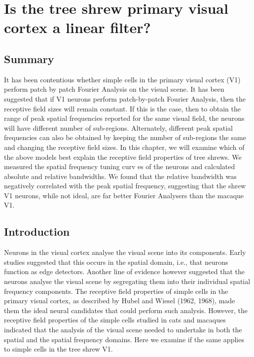 \chapter{Is the tree shrew primary visual cortex a linear filter?}
\pagebreak
	\section{Summary}
	It has been contentious whether simple cells in the primary visual cortex (V1) perform patch by patch Fourier Analysis on the visual scene. It has been suggested that if V1 neurons perform patch-by-patch Fourier Analysis, then the receptive field sizes will remain constant. If this is the case, then to obtain the range of peak spatial frequencies reported for the same visual field, the neurons will have different number of sub-regions. Alternately, different peak spatial frequencies can also be obtained by keeping the number of sub-regions the same and changing the receptive field sizes. In this chapter, we will examine which of the above models best explain the receptive field properties of tree shrews. We measured the spatial frequency tuning curv es of the neurons and calculated absolute and relative bandwidths. We found that the relative bandwidth was negatively correlated with the peak spatial frequency, suggesting that the shrew V1 neurons, while not ideal, are far better Fourier Analysers than the macaque V1.
	\pagebreak
	\section{Introduction}
	
	Neurons in the visual cortex analyse the visual scene into its components. Early studies suggested that this occurs in the spatial domain, i.e., that neurons function as edge detectors. Another line of evidence however suggested that the neurons analyse the visual scene by segregating them into their individual spatial frequency components. The receptive field properties of simple cells in the primary visual cortex, as described by Hubel and Wiesel (1962, 1968), made them the ideal neural candidates that could perform such analysis. However, the receptive field properties of the simple cells studied in cats and macaques indicated that the analysis of the visual scene needed to undertake in both the spatial and the spatial frequency domains. Here we examine if the same applies to simple cells in the tree shrew V1.
	
